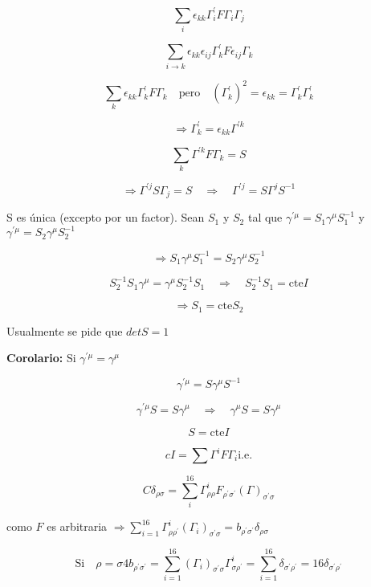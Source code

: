 \documentclass{report}
\begin{document}
\[\sum_{i} \epsilon _{kk} \Gamma_{i}^{\prime} F \Gamma_{i} \Gamma_{j}\]

\[\sum_{i \rightarrow k} \epsilon_{kk} \epsilon_{ij} \Gamma_{k}^{\prime} F \epsilon_{ij} \Gamma_{k}\]

\[\sum_{k} \epsilon_{kk} \Gamma_{k}^{\prime} F \Gamma_{k} \quad \text{pero} \quad (\Gamma_{k}^{\prime})^2 = \epsilon_{kk} = \Gamma_{k}^{\prime} \Gamma_{k}^{\prime}\]

\[ \Rightarrow \Gamma_{k}^{\prime} = \epsilon_{kk} \Gamma^{\prime k}\]

\[\sum_{k} \Gamma^{\prime k} F \Gamma_{k} = S\]

\[\Rightarrow \Gamma^{\prime j} S \Gamma_{j} = S \quad \Rightarrow \quad \Gamma^{\prime j} = S \Gamma^{j} S^{-1}\]

S es única (excepto por un factor). Sean $S_{1}$ y $S_{2}$ tal que $\gamma^{\prime \mu} = S_{1} \gamma^{\mu} S_{1}^{-1}$ y $\gamma^{\prime \mu} = S_{2} \gamma^{\mu} S_{2}^{-1}$

\[\Rightarrow S_{1} \gamma^{\mu} S_{1}^{-1} = S_{2} \gamma^{\mu} S_{2}^{-1}\]

\[S_{2}^{-1} S_{1} \gamma^{\mu} = \gamma^{\mu} S_{2}^{-1}S_{1} \quad \Rightarrow \quad S_{2}^{-1}S_{1} = \text{cte}I\]

\[ \Rightarrow S_{1} = \text{cte}S_{2}\]

Usualmente se pide que $det S = 1$

\textbf{Corolario:} Si $\gamma^{\prime \mu} = \gamma^{\mu}$

\[\gamma^{\prime \mu} = S \gamma^{\mu} S^{-1} \]

\[\gamma^{\prime \mu} S = S \gamma^{\mu} \quad \Rightarrow \quad \gamma^{\mu} S = S \gamma^{\mu}\]

\[S = \text{cte} I\]

\[c I = \sum \Gamma^{i} F \Gamma_{i} \text{i.e.}\]

\begin{equation}
C \delta _{\rho \sigma} = \sum_{i}^{16} \Gamma_{\rho \rho}^{i} F_{\rho^{\prime} \sigma^{\prime}} (\Gamma)_{\sigma^{\prime} \sigma}
\end{equation}

como $F$ es arbitraria $\Rightarrow \sum_{i = 1}^{16} \Gamma_{\rho \rho^{\prime}}^{i}(\Gamma_{i})_{\sigma^{\prime}\sigma} = b _{\rho^{\prime}\sigma^{\prime}} \delta_{\rho \sigma}$

\[\text{Si} \quad \rho = \sigma 4 b_{\rho ^{\prime} \sigma^{\prime}} = \sum_{i = 1} ^{16} (\Gamma_{i})_{\sigma^{\prime} \sigma} \Gamma_{\sigma \rho ^{\prime}} ^{i} = \sum _{i =1} ^{16} \delta _{\sigma ^{\prime} \rho^{\prime}} = 16 \delta _{\sigma^{\prime} \rho^{\prime}}\]
\end{document}
